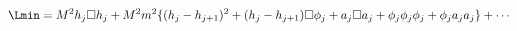 \begin{equation}
\Lmin =   M^2 h_j \square h_j + M^2 m^2
\{ (h_j-h_{j+1})^2 +  (h_j-h_{j+1}) \square \phi_j +
a_j \square a_j + \phi_j\phi_j\phi_j+ \phi_j a_j a_j\} + \cdots 
\label{lminsite}
\end{equation}

